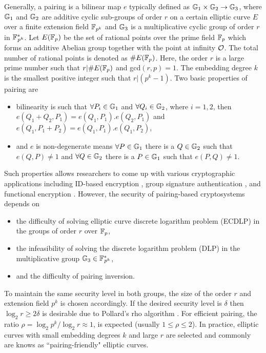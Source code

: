 Generally, a pairing is a bilinear map $e$ typically defined as  ${\mathbb{G}}_{1} \times {\mathbb{G}}_{2} \to {\mathbb{G}}_{3}$, where ${\mathbb{G}}_{1}$ and ${\mathbb{G}}_{2}$ are additive cyclic sub-groups of  order $r$  on a certain elliptic curve $E$ over a finite extension field $\mathbb{F}_{p^k}$ and ${\mathbb{G}}_{3}$ is a multiplicative cyclic group of order $r$ in ${{\mathbb{F}}^{\ast}}_{\!\!\!p^{k}}$.
Let $E({\mathbb{F}}_{p})$ be the set of rational points over the prime field ${\mathbb{F}}_{p}$ which forms an additive Abelian group together with the point at infinity $\cal{O}$. The total number of rational points is denoted as $\#E({\mathbb{F}}_{p})$. Here, the order $r$ is a large prime number such that $r | \#E({\mathbb{F}}_{p})$ and gcd$(r,p)=1$. The embedding degree $k$ is the smallest positive integer such that $r | (p^k -1)$.
Two basic properties of pairing are
\begin{itemize}
	\item bilinearity is such that $\forall P_i \in {\mathbb{G}}_{1}$ and $\forall Q_i \in {\mathbb{G}}_{2}$, where $i= 1, 2$, then $e(Q_1+Q_2,P_1) = e(Q_1,P_1). e(Q_2,P_1)$ and $e(Q_1,P_1+P_2) = e(Q_1,P_1). e(Q_1,P_2)$,
	\item and $e$ is non-degenerate means $\forall P \in {\mathbb{G}}_{1}$ there is a $Q \in {\mathbb{G}}_{2}$ such that  $e(Q,P) \neq 1$ and $\forall Q \in {\mathbb{G}}_{2}$ there is a $P \in {\mathbb{G}}_{1}$ such that $e(P,Q) \neq 1$.
\end{itemize}
Such properties allows researchers to come up with various cryptographic applications including ID-based encryption \cite{C:BonFra01}, group signature authentication \cite{C:BonBoySha04}, and functional encryption \cite{C:OkaTak10}.  However, the security of pairing-based cryptosystems depends  on 
\begin{itemize}
	\item  the difficulty of solving elliptic curve discrete logarithm problem (ECDLP) in the groups of order $r$ over ${\mathbb{F}}_{p}$,
	\item  the infeasibility of solving the discrete logarithm problem (DLP) in the multiplicative group ${\mathbb{G}}_{3} \in {{\mathbb{F}}^{\ast}}_{\!\!\!p^{k}}$,
	\item and the difficulty of pairing inversion.
\end{itemize}
To maintain the same security level in both groups, the size of the order $r$ and extension field $p^k$ is chosen accordingly. If the desired security level is $\delta$ then $\log_2 r  \geq 2\delta$ is desirable due to Pollard's rho algorithm \cite{1978-pollard-kangaroo}.  For efficient pairing, the ratio $\rho = \log_2 p^k/ \log_2 r \approx 1$,   is expected (usually  $1\leq  \rho  \leq 2$). In practice, elliptic curves with small embedding degrees $k$ and large $r$ are selected and commonly are knows as ``pairing-friendly" elliptic curves.

